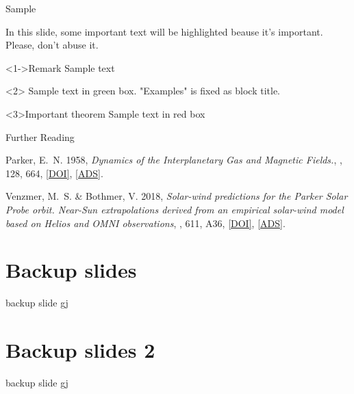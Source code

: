 \documentclass[11pt]{beamer}	%
\begin{document}
\begin{frame}[t]{Sample}{}
	
	In this slide, some important text will be
	\alert<2->{highlighted} beause it's important.
	Please, don't abuse it.
	
	\begin{block}<1->{Remark}
	Sample text
	\end{block}
	
	\begin{examples}
	Sample text in green box. "Examples" is fixed as block title.
	\end{examples}
	
	\begin{alertblock}{Important theorem}
	Sample text in red box
	\end{alertblock}
	
\end{frame}

\begin{frame}[allowframebreaks]{Further Reading}
	\begin{thebibliography}{10}
	
		\beamertemplatebookbibitems
		
		\beamertemplatearticlebibitems
		
			{Parker}, E.~N. 1958, \emph{{Dynamics of the Interplanetary Gas and Magnetic Fields.}}, \apj, 128, 664, \href{http://dx.doi.org/10.1086/146579}{[DOI]}, \href{http://adsabs.harvard.edu/abs/1958ApJ...128..664P}{[ADS]}.
			
			{Venzmer}, M.~S. \& {Bothmer}, V. 2018, \emph{{Solar-wind predictions for the
			Parker Solar Probe orbit. Near-Sun extrapolations derived from an empirical
			solar-wind model based on Helios and OMNI observations}}, \aap, 611, A36,
			\href{http://dx.doi.org/10.1051/0004-6361/201731831}{[DOI]},
			\href{http://adsabs.harvard.edu/abs/2018A\%26A...611A..36V}{[ADS]}.

	\end{thebibliography}
\end{frame}

\appendix

\section{Backup slides}

\begin{frame}{backup slide}{}
	gj
\end{frame}

\section{Backup slides 2}

\begin{frame}{backup slide}{}
	gj
\end{frame}

% 
\end{document}
